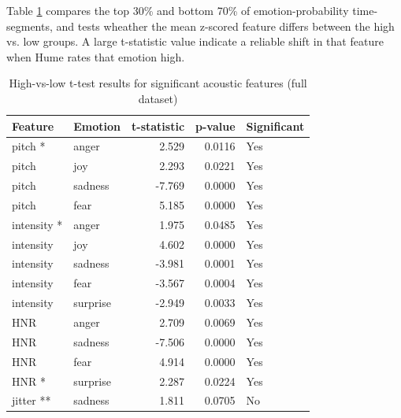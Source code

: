 \medskip
Table \ref{tab:ttest_full_features} compares the top 30\% and bottom 70\% of emotion-probability time-segments, and tests wheather the mean z-scored feature differs between the high vs. low groups. 
A large t-statistic value indicate a reliable shift in that feature when Hume rates that emotion high. 
\begin{table}[H]
    \centering
    \begin{tabular}{l l r r l}
      \toprule
      \textbf{Feature} & \textbf{Emotion} & \textbf{t-statistic} & \textbf{p-value} & \textbf{Significant} \\
      \midrule
        pitch *     & anger   &  2.529      & 0.0116    & Yes         \\
        pitch       & joy     &  2.293      & 0.0221    & Yes         \\
        pitch       & sadness & -7.769      & 0.0000    & Yes         \\
        pitch       & fear    &  5.185      & 0.0000    & Yes         \\
        intensity * & anger   &  1.975      & 0.0485    & Yes         \\
        intensity   & joy     &  4.602      & 0.0000    & Yes         \\
        intensity   & sadness & -3.981      & 0.0001    & Yes         \\
        intensity   & fear    & -3.567      & 0.0004    & Yes         \\
        intensity   & surprise& -2.949      & 0.0033    & Yes         \\
        HNR         & anger   &  2.709      & 0.0069    & Yes         \\
        HNR         & sadness & -7.506      & 0.0000    & Yes         \\
        HNR         & fear    &  4.914      & 0.0000    & Yes         \\
        HNR *       & surprise&  2.287      & 0.0224    & Yes         \\
        jitter **   & sadness &  1.811      & 0.0705    & No          \\
      \bottomrule
    \end{tabular}
    \caption{High-vs-low t-test results for significant acoustic features (full dataset)}
    \label{tab:ttest_full_features}
  \end{table}
  
